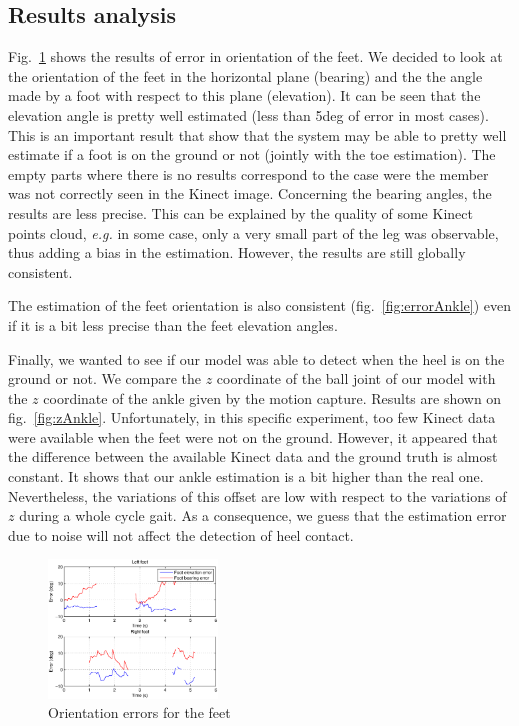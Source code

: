 \documentclass[letterpaper, 10 pt, conference]{ieeeconf}
\begin{document}
\subsection{Results analysis}

Fig.~\ref{fig:footError} shows the results of error in orientation of the feet. We decided to look at the orientation of the feet in the horizontal plane (bearing) and the the angle made by a foot with respect to this plane (elevation). It can be seen that the elevation angle is pretty well estimated (less than 5deg of error in most cases). This is an important result that show that the system may be able to pretty well estimate if a foot is on the ground or not (jointly with the toe estimation). The empty parts where there is no results correspond to the case were the member was not correctly seen in the Kinect image. Concerning the bearing angles, the results are less precise. This can be explained by the quality of some Kinect points cloud, \textit{e.g.} in some case, only a very small part of the leg was observable, thus adding a bias in the estimation. However, the results are still globally consistent.%

The estimation of the feet orientation is also consistent (fig.~\ref{fig:errorAnkle}) even if it is a bit less precise than the feet elevation angles. 

Finally, we wanted to see if our model was able to detect when the heel is on the ground or not. We compare the $z$ coordinate of the ball joint of our model with the $z$ coordinate of the ankle given by the motion capture.  Results are shown on fig.~\ref{fig:zAnkle}. Unfortunately, in this specific experiment, too few Kinect data were available when the feet were not on the ground. However, it appeared that the difference between the available Kinect data and the ground truth is almost constant. It shows that our ankle estimation is a bit higher than the real one. Nevertheless, the variations of this offset are low with respect to the variations of $z$ during a whole cycle gait. As a consequence, we guess that the estimation error due to noise will not affect the detection of heel contact.



\begin{figure}
	\centering
	\includegraphics[width=0.4\textwidth,trim=.5cm 0.45cm 0cm 0cm,clip=true]{images/footError}
	\caption{Orientation errors for the feet}
	\label{fig:footError}
\end{figure}
\end{document}
